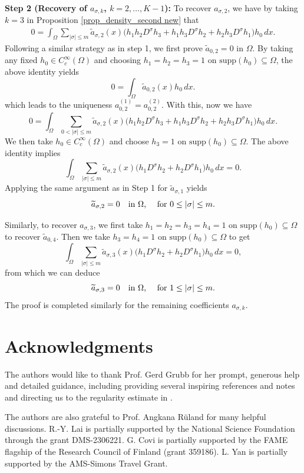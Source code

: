 \documentclass [oneside,11pt] {amsart}
\numberwithin{equation}{section}
\newcommand{\supp}{\mathrm{supp}}
\newcommand{\dx}{\,dx}
\begin{document}
{\bf Step 2 (Recovery of $a_{\sigma, k}$, $k=2,\ldots,K-1$):}
To recover $a_{\sigma,2}$, we have by taking $k=3$ in Proposition \ref{prop_density_second new} that 
\begin{align}\label{eq_pf_main_3}
0 = \int_\Omega \sum_{|\sigma|\le m} \widetilde{a}_{\sigma,2}(x) \Big( h_{1}h_{2}D^\sigma h_{3}+h_{1}h_{3}D^\sigma h_{2}+h_{2}h_{3}D^\sigma{h_{1}} \Big) h_0 \dx.
\end{align}
Following a similar strategy as in step 1, we first prove $\widetilde{a}_{0,2}=0$ in $\Omega$. By taking any fixed $h_0\in C_c^\infty(\Omega)$ and choosing
$h_1 = h_2=h_3 = 1$ on $\supp (h_0)\subseteq \Omega$, the above identity yields 
\[
0= \int_\Omega \widetilde{a}_{0,2}(x)h_0 \dx.
\]
which leads to the uniqueness $a_{0,2}^{(1)}=a_{0,2}^{(2)}$.  
With this, now we have 
\[
0 = \int_\Omega \sum_{0<|\sigma|\le m} \widetilde{a}_{\sigma,2}(x) \Big( h_{1}h_{2}D^\sigma h_{3}+h_{1}h_{3}D^\sigma h_{2}+h_{2}h_{3}D^\sigma{h_{1}} \Big) h_0 \dx.
\]
We then take $h_0\in C_c^\infty(\Omega)$ and choose
$h_3 = 1$ on $\supp (h_0)\subseteq \Omega$. The above identity implies 
\[ 
\int_\Omega\sum_{|\sigma|\le m} \widetilde{a}_{\sigma,2}(x) \Big( h_1D^\sigma{h_{2}}+h_2D^\sigma{h_{1}} \Big) h_0 \dx = 0.
\]
Applying the same argument as in Step 1 for $\widetilde{a}_{\sigma,1}$ yields
$$
\widetilde{a}_{\sigma
,2} =0\quad \hbox{in $\Omega$, \quad for $0\le |\sigma|\leq m$}.
$$

Similarly, to recover $a_{\sigma,3}$, we first take $h_1=h_2=h_3=h_4=1$ on $\supp (h_0)\subseteq \Omega$ to recover $\widetilde{a}_{0,4}$. Then we take
$h_3 =h_4= 1$ on $\supp (h_0)\subseteq \Omega$ to get 
\[ 
\int_\Omega\sum_{|\sigma|\le m} \widetilde{a}_{\sigma,3}(x) \Big( h_1D^\sigma{h_{2}}+h_2D^\sigma{h_{1}} \Big) h_0 \dx = 0,
\]
from which we can deduce
$$
\widetilde{a}_{\sigma
,3} =0\quad \hbox{in $\Omega$, \quad for $1\le|\sigma|\leq m$}.
$$
The proof is completed similarly for the remaining coefficients $a_{\sigma, k}$. 

\section{Acknowledgments}\label{sec:ack}
The authors would like to thank Prof. Gerd Grubb for her prompt, generous help and detailed guidance, including providing several inspiring references and notes and directing us to the regularity estimate in \cite{Grubb}.

The authors are also grateful to Prof. Angkana R\"uland for many helpful discussions. 
R.-Y. Lai is partially supported by the National Science Foundation through the grant DMS-2306221. G. Covi is partially supported by the FAME flagship of the Research Council of Finland (grant 359186). L. Yan is partially supported by the AMS-Simons Travel Grant. 
\end{document}
